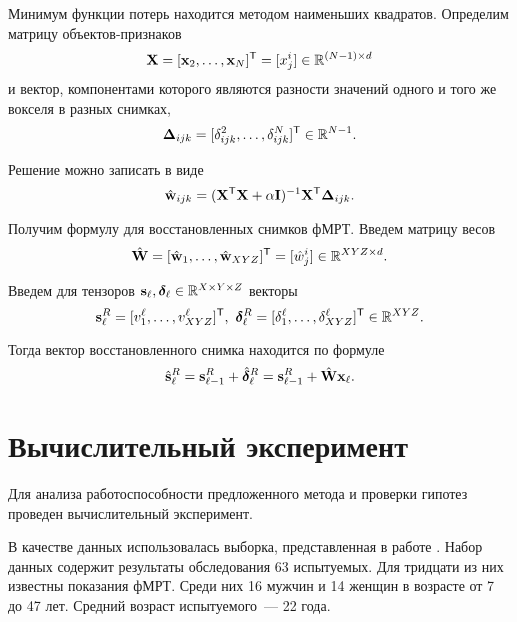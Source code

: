 \documentclass[a4paper, 12pt]{extarticle}
\begin{document}
Минимум функции потерь находится методом наименьших квадратов. Определим матрицу объектов-признаков
\begin{equation}
	\label{eq10}
	\mathbf{X} = [\mathbf{x}_2, \ldots, \mathbf{x}_N]^{\mathsf{T}} = [x^i_j] \in \mathbb{R}^{(N-1) \times d}
\end{equation}
и вектор, компонентами которого являются разности значений одного и того же вокселя в разных снимках,
\begin{equation}
	\label{eq11}
	\mathbf{\Delta}_{ijk} = [\delta^2_{ijk}, \ldots, \delta^N_{ijk}]^{\mathsf{T}} \in \mathbb{R}^{N-1}.
\end{equation}

Решение можно записать в виде
\begin{equation}
	\label{eq12}
	\hat{\mathbf{w}}_{ijk} = (\mathbf{X}^{\mathsf{T}} \mathbf{X} + \alpha \mathbf{I})^{-1} \mathbf{X}^{\mathsf{T}} \mathbf{\Delta}_{ijk}.
\end{equation}

Получим формулу для восстановленных снимков фМРТ. Введем матрицу весов
\begin{equation}
	\label{eq13}
	\hat{\mathbf{W}} = [\hat{\mathbf{w}}_1, \ldots, \hat{\mathbf{w}}_{XYZ}]^{\mathsf{T}} = [\hat{w}^i_j] \in \mathbb{R}^{XYZ \times d}.
\end{equation}

Введем для тензоров $\mathbf{s}_{\ell}, \boldsymbol{\delta}_{\ell} \in \mathbb{R}^{X \times Y \times Z}$ векторы
\[ \mathbf{s}_{\ell}^{R} = [ v^{\ell}_1, \ldots, v^{\ell}_{XYZ} ]^{\mathsf{T}},\
	\boldsymbol{\delta}_{\ell}^{R} = [ \delta^{\ell}_1, \ldots, \delta^{\ell}_{XYZ} ]^{\mathsf{T}} \in \mathbb{R}^{XYZ}. \]

Тогда вектор восстановленного снимка находится по формуле
\begin{equation}
	\label{eq14}
	\hat{\mathbf{s}}_{\ell}^{R} = \mathbf{s}_{\ell-1}^{R} + \hat{\boldsymbol{\delta}}_{\ell}^{R} = \mathbf{s}_{\ell-1}^{R} + \hat{\mathbf{W}} \mathbf{x}_{\ell}.
\end{equation}

\section{Вычислительный эксперимент}

Для анализа работоспособности предложенного метода и проверки гипотез
проведен вычислительный эксперимент.

В качестве данных использовалась выборка, представленная в работе \citep{Berezutskaya2022}.
Набор данных содержит результаты обследования 63 испытуемых.
Для тридцати из них известны показания фМРТ.
Среди них 16 мужчин и 14 женщин в возрасте от 7 до 47 лет.
Средний возраст испытуемого~--- 22 года.
\end{document}
